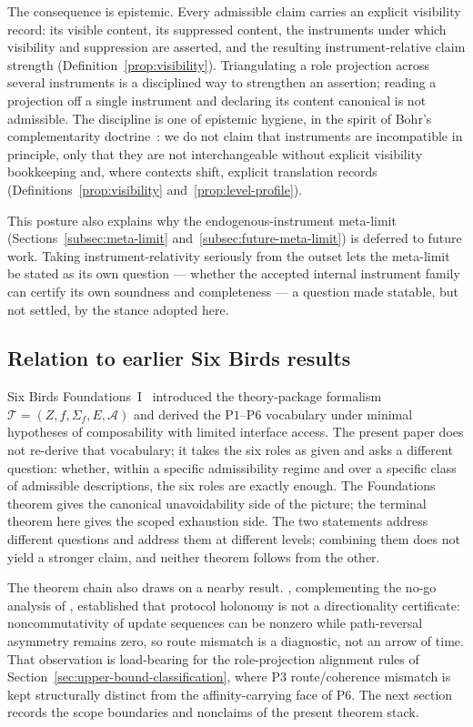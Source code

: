 \documentclass[11pt]{article}
\theoremstyle{definition}
\newcommand{\Pone}{\ensuremath{\mathrm{P1}}}
\newcommand{\Pthree}{\ensuremath{\mathrm{P3}}}
\newcommand{\Psix}{\ensuremath{\mathrm{P6}}}
\begin{document}
The consequence is epistemic. Every admissible claim carries an
explicit visibility record: its visible content, its suppressed
content, the instruments under which visibility and suppression are
asserted, and the resulting instrument-relative claim strength
(Definition~\ref{prop:visibility}). Triangulating a role projection
across several instruments is a disciplined way to strengthen an
assertion; reading a projection off a single instrument and declaring
its content canonical is not admissible. The discipline is one of
epistemic hygiene, in the spirit of Bohr's complementarity
doctrine~\citep{Bohr1958}: we do not claim that instruments are
incompatible in principle, only that they are not interchangeable
without explicit visibility bookkeeping and, where contexts shift,
explicit translation records
(Definitions~\ref{prop:visibility} and~\ref{prop:level-profile}).

This posture also explains why the endogenous-instrument meta-limit
(Sections~\ref{subsec:meta-limit} and~\ref{subsec:future-meta-limit})
is deferred to future work. Taking instrument-relativity seriously
from the outset lets the meta-limit be stated as its own question ---
whether the accepted internal instrument family can certify its own
soundness and completeness --- a question made statable, but not
settled, by the stance adopted here.

\subsection{Relation to earlier Six Birds results}\label{subsec:discussion-earlier-results}

Six Birds Foundations~I~\citep{Tsiokos2026SixBirdsFoundations}
introduced the theory-package formalism
\(\mathcal{T} = (Z, f, \Sigma_f, E, \mathcal{A})\) and derived the
\Pone{}--\Psix{} vocabulary under minimal hypotheses of composability
with limited interface access. The present paper does not re-derive
that vocabulary; it takes the six roles as given and asks a
different question: whether, within a specific admissibility regime
and over a specific class of admissible descriptions, the six roles
are exactly enough. The Foundations theorem gives the canonical
unavoidability side of the picture; the terminal theorem here gives
the scoped exhaustion side. The two statements address different
questions and address them at different levels; combining them does
not yield a stronger claim, and neither theorem follows from the
other.

The theorem chain also draws on a nearby
result. \citet{Tsiokos2026SixBirdsProtocolTrap}, complementing the
no-go analysis of \citet{Tsiokos2026SixBirdsNoGo}, established that
protocol holonomy is not a directionality certificate:
noncommutativity of update sequences can be nonzero while
path-reversal asymmetry remains zero, so route mismatch is a
diagnostic, not an arrow of time. That observation is load-bearing
for the role-projection alignment rules of
Section~\ref{sec:upper-bound-classification}, where \Pthree{}
route/coherence mismatch is kept structurally distinct from the
affinity-carrying face of \Psix{}. The next section records the
scope boundaries and nonclaims of the present theorem stack.
\end{document}
